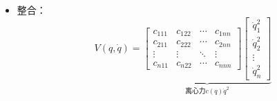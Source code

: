 \documentclass[
12pt, %
a4paper, 
oneside, %
headinclude,footinclude, %
]{scrartcl}
\begin{document}
\begin{itemize}
故：
{\footnotesize
$$
\textcolor{blue}{\begin{bmatrix} \dot{q}^T \frac{\partial M(q)}{\partial q_1}\dot{q} \\ \vdots \\ \dot{q}^T \frac{\partial M(q)}{\partial q_n}\dot{q} \end{bmatrix}} 
= \begin{bmatrix} b_{1,1,1} & b_{2,2,1} & \cdots & b_{n,n,1} \\ b_{1,1,2} & b_{2,2,2} & \cdots & b_{n,n,2} \\ \vdots & \vdots & \ddots & \vdots \\ b_{1,1,n} & b_{2,2,n} & \cdots & b_{n,n,n} \end{bmatrix}
\begin{bmatrix} \dot{q}_1^2 \\ \dot{q}_2^2 \\ \vdots \\ \dot{q}_n^2 \end{bmatrix}
+ 2\begin{bmatrix} b_{1,2,1} & b_{1,3,1} & \cdots & b_{n - 1,n,1} \\ b_{1,2,2} & b_{1,3,2} & \cdots & b_{n - 1,n,2} \\ \vdots & \vdots & \ddots & \vdots \\ b_{1,2,n} & b_{1,3,n} & \cdots & b_{n - 1,n,n} \end{bmatrix}_{n \times \frac{n^2 - n}{2}}
\begin{bmatrix} \dot{q}_1 \dot{q}_2 \\ \dot{q}_1 \dot{q}_3 \\ \vdots \\ \dot{q}_{n - 1} \dot{q}_n \end{bmatrix}_{\frac{n^2 - n}{2}}
$$
}
\item 整合：
$$
V(q, \dot{q}) = 
\underbrace{\begin{bmatrix} c_{111} & c_{122} & \cdots & c_{1nn} \\ c_{211} & c_{222} & \cdots & c_{2nn} \\ \vdots & \vdots & \ddots & \vdots \\ c_{n11} & c_{n22} & \cdots & c_{nnn} \end{bmatrix} \begin{bmatrix} \dot{q}_1^2 \\ \dot{q}_2^2 \\ \vdots \\ \dot{q}_n^2 \end{bmatrix}}_{\text{离心力}c(q) \dot{q}^2}
$$
\end{itemize}
\end{document}
